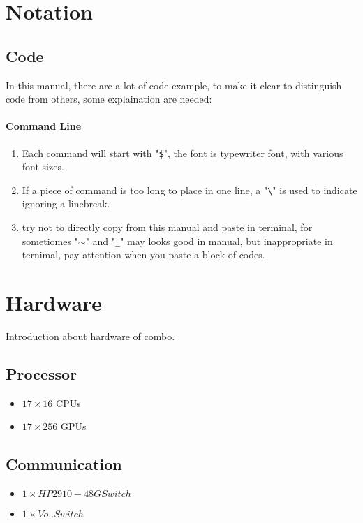\section{Notation}
\subsection{Code}
In this manual, there are a lot of code example, to make it clear to distinguish code from others, some explaination are needed:
\paragraph{Command Line}
\begin{enumerate}
\item Each command will start with "{\tt \$}", the font is typewriter font, with various font sizes.
\item If a piece of command is too long to place in one line, a "{\tt \textbackslash}" is used to indicate ignoring a linebreak.
\item try not to directly copy from this manual and paste in terminal, for sometiomes "{\tt $\sim$}" and "{\tt \_}" may looks good in manual, but inappropriate in ternimal, pay attention when you paste a block of codes.
\end{enumerate}




\section{Hardware}

Introduction about hardware of combo.

\subsection{Processor}

\begin{itemize}
\item $17 \times 16$ CPUs
\item $17 \times 256$ GPUs
\end{itemize}

\subsection{Communication}

\begin{itemize}
\item $1 \times HP 2910-48G Switch $
\item $1 \times Vo.. Switch $
\end{itemize}

